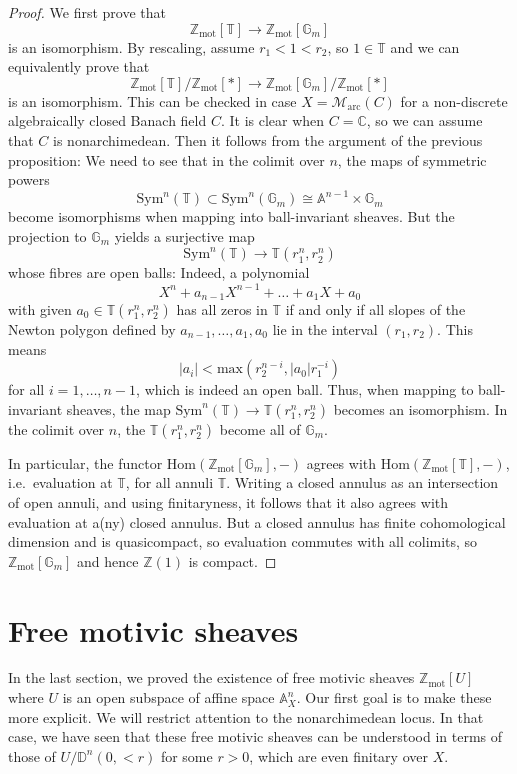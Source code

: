 \documentclass[11pt]{amsart}
\numberwithin{equation}{section}
\numberwithin{theorem}{section}
\theoremstyle{definition}
\begin{document}
\begin{proof} We first prove that
\[
\mathbb Z_{\mathrm{mot}}[\mathbb T]\to \mathbb Z_{\mathrm{mot}}[\mathbb G_m]
\]
is an isomorphism. By rescaling, assume $r_1<1<r_2$, so $1\in \mathbb T$ and we can equivalently prove that
\[
\mathbb Z_{\mathrm{mot}}[\mathbb T]/\mathbb Z_{\mathrm{mot}}[\ast]\to \mathbb Z_{\mathrm{mot}}[\mathbb G_m]/\mathbb Z_{\mathrm{mot}}[\ast]
\]
is an isomorphism. This can be checked in case $X=\mathcal M_{\mathrm{arc}}(C)$ for a non-discrete algebraically closed Banach field $C$. It is clear when $C=\mathbb C$, so we can assume that $C$ is nonarchimedean. Then it follows from the argument of the previous proposition: We need to see that in the colimit over $n$, the maps of symmetric powers
\[
\mathrm{Sym}^n(\mathbb T)\subset \mathrm{Sym}^n(\mathbb G_m)\cong \mathbb A^{n-1}\times \mathbb G_m
\]
become isomorphisms when mapping into ball-invariant sheaves. But the projection to $\mathbb G_m$ yields a surjective map
\[
\mathrm{Sym}^n(\mathbb T)\to \mathbb T(r_1^n,r_2^n)
\]
whose fibres are open balls: Indeed, a polynomial
\[
X^n+a_{n-1}X^{n-1}+\ldots+a_1X+a_0
\]
with given $a_0\in \mathbb T(r_1^n,r_2^n)$ has all zeros in $\mathbb T$ if and only if all slopes of the Newton polygon defined by $a_{n-1},\ldots,a_1,a_0$ lie in the interval $(r_1,r_2)$. This means
\[
|a_i|<\mathrm{max}(r_2^{n-i},|a_0|r_1^{-i})
\]
for all $i=1,\ldots,n-1$, which is indeed an open ball. Thus, when mapping to ball-invariant sheaves, the map $\mathrm{Sym}^n(\mathbb T)\to \mathbb T(r_1^n,r_2^n)$ becomes an isomorphism. In the colimit over $n$, the $\mathbb T(r_1^n,r_2^n)$ become all of $\mathbb G_m$.

In particular, the functor $\mathrm{Hom}(\mathbb Z_{\mathrm{mot}}[\mathbb G_m],-)$ agrees with $\mathrm{Hom}(\mathbb Z_{\mathrm{mot}}[\mathbb T],-)$, i.e.~evaluation at $\mathbb T$, for all annuli $\mathbb T$. Writing a closed annulus as an intersection of open annuli, and using finitaryness, it follows that it also agrees with evaluation at a(ny) closed annulus. But a closed annulus has finite cohomological dimension and is quasicompact, so evaluation commutes with all colimits, so $\mathbb Z_{\mathrm{mot}}[\mathbb G_m]$ and hence $\mathbb Z(1)$ is compact.
\end{proof}


\section{Free motivic sheaves}

In the last section, we proved the existence of free motivic sheaves $\mathbb Z_{\mathrm{mot}}[U]$ where $U$ is an open subspace of affine space $\mathbb A^n_X$. Our first goal is to make these more explicit. We will restrict attention to the nonarchimedean locus. In that case, we have seen that these free motivic sheaves can be understood in terms of those of $U/\mathbb D^n(0,<r)$ for some $r>0$, which are even finitary over $X$.
\end{document}
